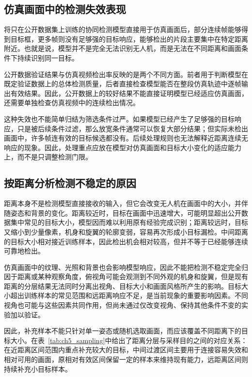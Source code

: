 \subsection{仿真画面中的检测失效表现}
\label{subsec:ch5_failure}

将只在公开数据集上训练的协同检测模型直接用于仿真画面后，部分连续帧能够得到目标框，更多帧则没有足够强的目标响应，能够检出的片段主要集中在特定距离附近。也就是说，模型并不是完全无法识别无人机，而是无法在不同距离和画面条件下持续识别同一目标。

公开数据验证结果与仿真视频检出率反映的是两个不同方面。前者用于判断模型在既定验证数据上的总体检测质量，后者直接检查模型能否在整段仿真轨迹中逐帧输出有效结果。因此，公开数据上的较好结果不能直接证明模型已经适应仿真画面，还需要单独检查仿真视频中的连续检出情况。

这种失效也不能简单归结为筛选条件过严。如果模型已经产生了足够强的目标响应，只是被后续条件过滤，那么放宽条件通常可以恢复大部分结果；但实际未检出画面中，许多帧连有效的目标候选都没有。后续处理规则也无法解释近距离连续无响应的现象。因此，处理重点应放在模型对仿真画面和目标大小变化的适应能力上，而不是只调整检测门限。

\subsection{按距离分析检测不稳定的原因}
\label{subsec:ch5_mechanism}

距离本身不是检测模型直接接收的输入，但它会改变无人机在画面中的大小，并伴随姿态和背景的变化。距离较近时，目标在画面中迅速增大，可能明显超出公开数据集中常见的目标大小，模型因而难以利用原有经验完成识别；距离较远时，目标又缩小到少量像素，机身和旋翼的轮廓变弱，容易再次形成小目标漏检。中间距离的目标大小相对接近训练样本，因此检出机会相对较高，但并不等于已经能够连续可靠地检出。

仿真画面中的纹理、光照和背景也会影响模型响应，因此不能把检测不稳定完全归因于距离或某种观察角度，俯视角可能会观测到不同外观的机身和旋翼，但是现有距离的分层结果无法同时分离出视角、目标大小和画面风格所产生的影响。目标大小超出训练样本的常见范围和远距离响应不足，是当前现象的重要影响因素。不同视角也可能与这些因素共同作用，但尚未通过仅改变视角、保持其他条件不变的实验加以验证。

因此，补充样本不能只针对单一姿态或随机选取画面，而应该覆盖不同距离下的目标大小。在表~\ref{tab:ch5_sampling}中给出了距离分层与采样目的之间的对应关系：在近距离区间范围内重点补充较大的目标，中间过渡区间主要用于连接容易失效和相对可用的画面，原相对有效区间保留一定的样本来维持现有能力，远距离区间则持续补充小目标样本。

